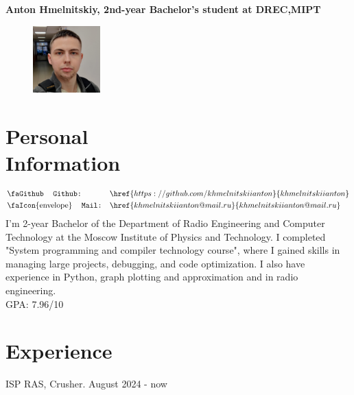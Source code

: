 \documentclass[margin,line]{resume}
\begin{document}
{\hspace*{-0.6cm}\LARGE\textbf{Anton Hmelnitskiy, 2nd-year Bachelor's student at DREC,MIPT}}
\begin{resume}

    \vspace{0.5cm}
\setlength{\intextsep}{10pt}
    \begin{figure}
         \vspace{-1.3cm}
        \begin{center}
        \includegraphics[width=0.23\textwidth]{photo.jpg}
        \end{center}
         \vspace{-1cm}
    \end{figure}

 
 \section{\mysidestyle Personal\\Information}
    \noindent
    \begin{align*}
    &\text{\faGithub \space}         \texttt{ Github:}         && \href{https://github.com/khmelnitskiianton}{khmelnitskiianton} \\ 
    &\text{\faIcon{envelope} \space}  \texttt{ Mail:} && \href{khmelnitskiianton@mail.ru}{khmelnitskiianton@mail.ru} 
    \end{align*}
     I'm 2-year Bachelor of the Department of Radio Engineering and Computer Technology at the Moscow Institute of Physics and Technology. I completed "System programming and compiler technology course", where I gained skills in managing large projects, debugging, and code optimization. I also have experience in Python, graph plotting and approximation and in radio engineering.\\
     GPA: 7.96/10
\vspace{0.2cm}
\section{\mysidestyle Experience}
    ISP RAS, Crusher. August 2024 - now

\end{resume}
\end{document}
